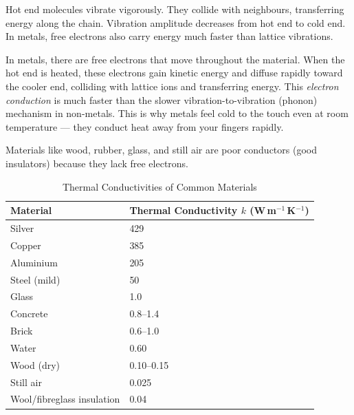 \begin{diagbox}
\begin{center}
\end{center}
\small Hot end molecules vibrate vigorously. They
collide with neighbours, transferring energy along
the chain. Vibration amplitude decreases from hot
end to cold end. In metals, free electrons also carry
energy much faster than lattice vibrations.
\end{diagbox}

\begin{keybox}
In metals, there are free electrons that move
throughout the material. When the hot end is heated,
these electrons gain kinetic energy and diffuse
rapidly toward the cooler end, colliding with lattice
ions and transferring energy. This \textit{electron
conduction} is much faster than the slower
vibration-to-vibration (phonon) mechanism in
non-metals. This is why metals feel cold to the
touch even at room temperature --- they conduct heat
away from your fingers rapidly.

Materials like wood, rubber, glass, and still air
are poor conductors (good insulators) because they
lack free electrons.
\end{keybox}

\begin{table}[H]
\centering
\caption{Thermal Conductivities of Common Materials}
\label{tab:conductivity}
\begin{tabular}{ll}
\toprule
\textbf{Material} & \textbf{Thermal Conductivity $k$
(W\,m$^{-1}$\,K$^{-1}$)}\\
\midrule
Silver & 429\\
Copper & 385\\
Aluminium & 205\\
Steel (mild) & 50\\
Glass & 1.0\\
Concrete & 0.8--1.4\\
Brick & 0.6--1.0\\
Water & 0.60\\
Wood (dry) & 0.10--0.15\\
Still air & 0.025\\
Wool/fibreglass insulation & 0.04\\
\bottomrule
\end{tabular}
\end{table}

